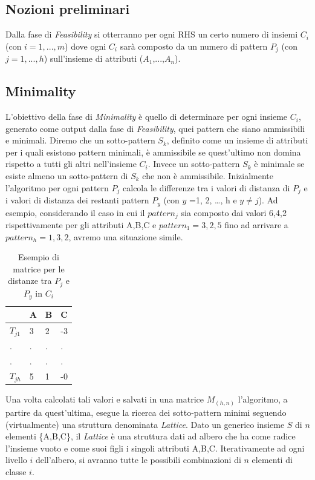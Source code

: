 \subsection{Nozioni preliminari}
Dalla fase di \emph{Feasibility} si otterranno per ogni RHS un certo numero di insiemi $C_i$ (con $i=1,...,m$) dove ogni $C_i$ sarà composto da un numero di pattern $P_j$ (con $j=1,...,h$) sull'insieme di attributi ($A_1$,...,$A_n$).
\subsection{Minimality}
L'obiettivo della fase di \emph{Minimality} è quello di determinare per ogni insieme $C_i$, generato come output dalla fase di \emph{Feasibility}, quei pattern che siano ammissibili e minimali. Diremo che un sotto-pattern $S_k$, definito come un insieme di attributi per i quali esistono pattern minimali, è ammissibile se quest'ultimo non domina rispetto a tutti gli altri nell'insieme $C_i$. Invece un sotto-pattern $S_k$ è minimale se esiste almeno un sotto-pattern di $S_k$ che non è ammissibile. Inizialmente l'algoritmo per ogni pattern $P_j$ calcola le differenze tra i valori di distanza di $P_j$ e i valori di distanza dei restanti pattern $P_y$ (con $y$ =1, 2, \ldots, h e $y \neq j$).  Ad esempio, considerando il caso in cui il $pattern_j$ sia composto dai valori 6,4,2 rispettivamente per gli attributi A,B,C e $pattern_1 = 3,2,5$ fino ad arrivare a $pattern_h = 1,3,2$, avremo una situazione simile.
\begin{table}[H]
	\centering
	\begin{tabular}{ | l | l | l | l |}
		\hline
		& A & B & C \\
		\hline
		$T_{j1}$ & 3 & 2 & -3\\
		\hline
		. & . & . & .\\ 
		\hline
		. & . & . & . \\  
		\hline 
		$T_{jh}$ & 5 & 1 & -0\\ 
		\hline
	\end{tabular}
	\caption{Esempio di matrice per le distanze tra $P_j$ e $P_y$ in $C_i$}
	\label{tab:table esempio}
\end{table}
Una volta calcolati tali valori e salvati in una matrice $M_{(h,n)}$ l'algoritmo, a partire da quest'ultima, esegue la ricerca dei sotto-pattern minimi seguendo (virtualmente) una struttura denominata \emph{Lattice}. Dato un generico insieme $S$ di $n$ elementi \{A,B,C\}, il \emph{Lattice} è una struttura dati ad albero che ha come radice l'insieme vuoto e come suoi figli i singoli attributi A,B,C. Iterativamente ad ogni livello $i$ dell'albero, si avranno tutte le possibili combinazioni di $n$ elementi di classe $i$.\\
